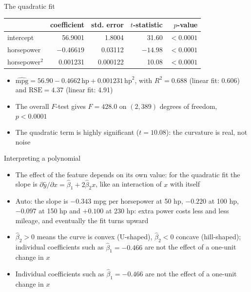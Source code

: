 \begin{frame}{The quadratic fit}
    \begin{center}
        \small
        \begin{tabular}{lrrrr}
            \toprule
            & coefficient & std. error & $t$-statistic & $p$-value \\
            \midrule
            intercept & 56.9001 & 1.8004 & 31.60 & $<0.0001$ \\
            horsepower & $-0.46619$ & 0.03112 & $-14.98$ & $<0.0001$ \\
            horsepower$^2$ & 0.001231 & 0.000122 & 10.08 & $<0.0001$ \\
            \bottomrule
        \end{tabular}
    \end{center}
    \begin{itemize}
        \item $\widehat{\text{mpg}} = 56.90 - 0.4662\,\text{hp} + 0.001231\,\text{hp}^2$, with $R^2 = 0.688$ (linear fit: 0.606) and $\mathrm{RSE} = 4.37$ (linear fit: 4.91)
        \item The overall $F$-test gives $F = 428.0$ on $(2, 389)$ degrees of freedom, $p < 0.0001$
        \item The quadratic term is highly significant ($t = 10.08$): the curvature is real, not noise
    \end{itemize}
\end{frame}


\begin{frame}{Interpreting a polynomial}
    \begin{itemize}
        \item The effect of the feature depends on its own value: for the quadratic fit the slope is $\partial \hat{y} / \partial x = \hat\beta_1 + 2 \hat\beta_2 x$, like an interaction of $x$ with itself
        \item Auto: the slope is $-0.343$ mpg per horsepower at 50 hp, $-0.220$ at 100 hp, $-0.097$ at 150 hp and $+0.100$ at 230 hp: extra power costs less and less mileage, and eventually the fit turns upward
        \item $\hat\beta_2 > 0$ means the curve is convex (U-shaped), $\hat\beta_2 < 0$ concave (hill-shaped); individual coefficients such as $\hat\beta_1 = -0.466$ are not the effect of a one-unit change in $x$
        \item Individual coefficients such as $\hat\beta_1 = -0.466$ are not the effect of a one-unit change in $x$
    \end{itemize}
\end{frame}


